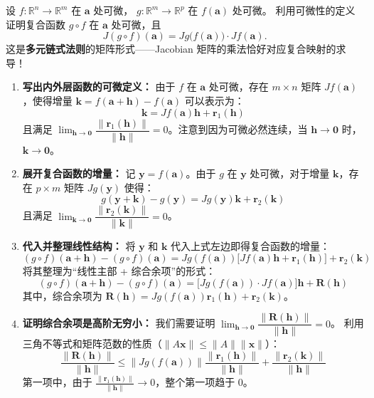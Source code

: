 \documentclass[lang=cn,11pt]{elegantbook}
\begin{document}
\begin{exercise}[提高：链式法则的矩阵形式]
设 $f:\mathbb R^n\to\mathbb R^m$ 在 $\boldsymbol a$ 处可微，
$g:\mathbb R^m\to\mathbb R^p$ 在 $f(\boldsymbol a)$ 处可微。
利用可微性的定义证明复合函数 $g\circ f$ 在 $\boldsymbol a$ 处可微，且
\[
J(g\circ f)(\boldsymbol a)=Jg\bigl(f(\boldsymbol a)\bigr)\cdot Jf(\boldsymbol a).
\]
这是\textbf{多元链式法则}的矩阵形式——Jacobian 矩阵的乘法恰好对应复合映射的求导！
\end{exercise}
\begin{solution}
\begin{enumerate}
  \item \textbf{写出内外层函数的可微定义：}
  由于 $f$ 在 $\boldsymbol a$ 处可微，存在 $m \times n$ 矩阵 $Jf(\boldsymbol a)$，使得增量 $\boldsymbol k = f(\boldsymbol a+\boldsymbol h)-f(\boldsymbol a)$ 可以表示为：
  \[
  \boldsymbol k = Jf(\boldsymbol a)\boldsymbol h + \boldsymbol r_1(\boldsymbol h)
  \]
  且满足 $\lim_{\boldsymbol h \to \boldsymbol 0} \dfrac{\|\boldsymbol r_1(\boldsymbol h)\|}{\|\boldsymbol h\|} = 0$。注意到因为可微必然连续，当 $\boldsymbol h \to \boldsymbol 0$ 时，$\boldsymbol k \to \boldsymbol 0$。

  \item \textbf{展开复合函数的增量：}
  记 $\boldsymbol y = f(\boldsymbol a)$。由于 $g$ 在 $\boldsymbol y$ 处可微，对于增量 $\boldsymbol k$，存在 $p \times m$ 矩阵 $Jg(\boldsymbol y)$ 使得：
  \[
  g(\boldsymbol y+\boldsymbol k)-g(\boldsymbol y) = Jg(\boldsymbol y)\boldsymbol k + \boldsymbol r_2(\boldsymbol k)
  \]
  且满足 $\lim_{\boldsymbol k \to \boldsymbol 0} \dfrac{\|\boldsymbol r_2(\boldsymbol k)\|}{\|\boldsymbol k\|} = 0$。
  
  \item \textbf{代入并整理线性结构：}
  将 $\boldsymbol y$ 和 $\boldsymbol k$ 代入上式左边即得复合函数的增量：
  \[
  (g \circ f)(\boldsymbol a+\boldsymbol h) - (g \circ f)(\boldsymbol a) = Jg(f(\boldsymbol a)) \bigl[ Jf(\boldsymbol a)\boldsymbol h + \boldsymbol r_1(\boldsymbol h) \bigr] + \boldsymbol r_2(\boldsymbol k)
  \]
  将其整理为“线性主部 + 综合余项”的形式：
  \[
  (g \circ f)(\boldsymbol a+\boldsymbol h) - (g \circ f)(\boldsymbol a) = \bigl[ Jg(f(\boldsymbol a)) \cdot Jf(\boldsymbol a) \bigr]\boldsymbol h + \boldsymbol R(\boldsymbol h)
  \]
  其中，综合余项为 $\boldsymbol R(\boldsymbol h) = Jg(f(\boldsymbol a))\boldsymbol r_1(\boldsymbol h) + \boldsymbol r_2(\boldsymbol k)$。
  
  \item \textbf{证明综合余项是高阶无穷小：}
  我们需要证明 $\lim_{\boldsymbol h \to \boldsymbol 0} \dfrac{\|\boldsymbol R(\boldsymbol h)\|}{\|\boldsymbol h\|} = 0$。
  利用三角不等式和矩阵范数的性质（$\|A\boldsymbol x\| \leqslant  \|A\|\|\boldsymbol x\|$）：
  \[
  \frac{\|\boldsymbol R(\boldsymbol h)\|}{\|\boldsymbol h\|} \leqslant  \|Jg(f(\boldsymbol a))\| \frac{\|\boldsymbol r_1(\boldsymbol h)\|}{\|\boldsymbol h\|} + \frac{\|\boldsymbol r_2(\boldsymbol k)\|}{\|\boldsymbol h\|}
  \]
  第一项中，由于 $\frac{\|\boldsymbol r_1(\boldsymbol h)\|}{\|\boldsymbol h\|} \to 0$，整个第一项趋于 0。
  

\end{enumerate}
\end{solution}
\end{document}
